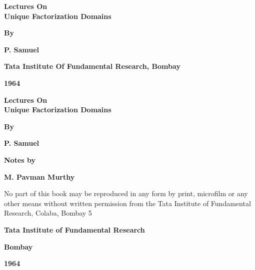 \thispagestyle{empty}
\begin{center}
{\Large\bf Lectures On}\\[5pt]
{\Large\bf Unique Factorization Domains}
\vskip 1cm 

{\bf By}
\medskip

{\large\bf P. Samuel}
\vfill

{\bf Tata Institute Of Fundamental Research, Bombay}


{\bf 1964}
\end{center}
\eject

\thispagestyle{empty}
\begin{center}
{\Large\bf Lectures On}\\[5pt] 
{\Large\bf Unique Factorization Domains}\\
\vskip 1cm

{\bf By}\\
\medskip

{\large\bf P. Samuel}\\

\vfill

{\bf Notes by}\\
\medskip

{\large\bf M. Pavman Murthy}\\
\vfill


\parbox{0.7\textwidth}{No part of this book may be reproduced
in any form by print, microfilm or any
other means without written permission
from the Tata Institute of Fundamental
Research, Colaba, Bombay 5}
\vfill

{\bf Tata Institute of Fundamental Research}

{\bf Bombay}

{\bf 1964}
\end{center}
